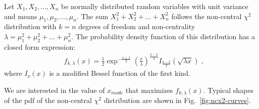 \documentclass[final,5p,twocolumn,preprint,nopreprintline,times,authoryear]{elsarticle}
\begin{document}
Let $X_1, X_2, ..., X_n$ be normally distributed random variables with unit variance and means $\mu_1, \mu_2, ..., \mu_n$. The sum $X_1^2 + X_2^2 + ... + X_n^2$ follows the non-central $\chi^2$ distribution with $k = n$ degrees of freedom and non-centrality $\lambda = \mu_1^2 + \mu_2^2 + ... + \mu_n^2$. The probability density function of this distribution has a closed form expression:
%
\begin{align}
    &f_{k, \lambda}(x) = \frac{1}{2} \exp^{-\frac{x + \lambda}{2}} \left(\frac{x}{\lambda}\right)^{\frac{k-2}{4}} I_{\frac{k-2}{2}}(\sqrt{\lambda x})\;,
\end{align}
%
where $I_{\nu}(x)$ is a modified Bessel function of the first kind.

We are interested in the value of $x_{mode}$ that maximizes $f_{k, \lambda}(x)$. Typical shapes of the pdf of the non-central $\chi^2$ distribution are shown in Fig.~\ref{fig:ncx2-curves}.
\end{document}
